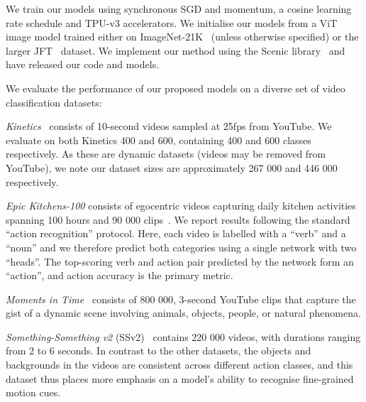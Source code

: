\documentclass[10pt,twocolumn,letterpaper]{article}
\makeatletter
\renewcommand{\paragraph}{\@startsection{paragraph}{4}{\z@}{1.625ex \@plus 1ex \@minus .2ex}{-1em}{\normalfont\normalsize\bfseries}}
\makeatother
\begin{document}
We train our models using synchronous SGD and momentum, a cosine learning rate schedule and TPU-v3 accelerators. We initialise our models from a ViT image model trained either on ImageNet-21K~\cite{deng_cvpr_2009} (unless otherwise specified) or the larger JFT~\cite{sun_iccv_2017} dataset.
We implement our method using the Scenic library~\cite{dehghani2021scenic} and have released our code and models.

\paragraph{Datasets}

We evaluate the performance of our proposed models on a diverse set of video classification datasets:

\emph{Kinetics}~\cite{kay_arxiv_2017} consists of 10-second videos sampled at 25fps from YouTube.
We evaluate on both Kinetics 400 and 600, containing 400 and 600 classes respectively.
As these are dynamic datasets (videos may be removed from YouTube), we note our dataset sizes are approximately 267 000 and 446 000 respectively.

\emph{Epic Kitchens-100} consists of egocentric videos capturing daily kitchen activities spanning 100 hours and 90 000 clips~\cite{damen_arxiv_2020}.
We report results following the standard ``action recognition'' protocol.
Here, each video is labelled with a ``verb'' and a ``noun'' and we therefore predict both categories using a single network with two ``heads''. The top-scoring verb and action pair predicted by the network form an ``action'', and action accuracy is the primary metric.

\emph{Moments in Time}~\cite{monfort_pami_2019} consists of 800 000,  3-second YouTube clips that capture the gist of a dynamic scene involving animals, objects, people, or natural phenomena. 

\emph{Something-Something v2} (SSv2)~\cite{goyal_iccv_2017} contains 220 000 videos, with durations ranging from 2 to 6 seconds.
In contrast to the other datasets, the objects and backgrounds in the videos are consistent across different action classes, and this dataset thus places more emphasis on a model's ability to recognise fine-grained motion cues.
\end{document}
